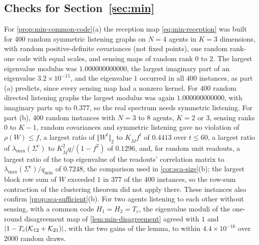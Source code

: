 \subsection{Checks for \texorpdfstring{Section~\ref{sec:min}}{the minimal model}}\label{chk:min}

\begin{numcheck}\label{chk:min-common-code}
For \cref{prop:min-common-code}(a) the reception map \eqref{eq:min-reception} was built for 400 random symmetric listening graphs on $N=4$ agents in $K=3$ dimensions, with random positive-definite covariances (not fixed points), one random rank-one code with equal scales, and sensing maps of random rank $0$ to $2$. The largest eigenvalue modulus was $1.000000000000$, the largest imaginary part of an eigenvalue $3.2\times10^{-15}$, and the eigenvalue $1$ occurred in all 400 instances, as part (a) predicts, since every sensing map had a nonzero kernel. For 400 random directed listening graphs the largest modulus was again $1.000000000000$, with imaginary parts up to $0.377$, so the real spectrum needs symmetric listening. For part (b), 400 random instances with $N=3$ to $8$ agents, $K=2$ or $3$, sensing ranks $0$ to $K-1$, random covariances and symmetric listening gave no violation of $\rho(W)\le f$, a largest ratio of $\Vert W^t\Vert_2$ to $K_{\tilde M}f^t$ of $0.4413$ over $t\le60$, a largest ratio of $\lambda_{\max}(\Sigma^c)$ to $K_{\tilde M}^2q/(1-f^2)$ of $0.1296$, and, for random unit readouts, a largest ratio of the top eigenvalue of the readouts' correlation matrix to $\lambda_{\max}(\Sigma^c)/q_{\min}$ of $0.7248$, the comparison used in \cref{cor:sca-size}(b); the largest block row sum of $W$ exceeded $1$ in 377 of the 400 instances, so the row-sum contraction of the clustering theorem did not apply there. These instances also confirm \cref{prop:sca-sufficient}(b). For two agents listening to each other without sensing, with a common code $H_1=H_2=T_c$, the eigenvalue moduli of the one-round disagreement map of \cref{lem:min-disagreement} agreed with $1$ and $\lvert1-T_c(\mathcal{K}_{12}+\mathcal{K}_{21})\rvert$, with the two gains of the lemma, to within $4.4\times10^{-16}$ over 2000 random draws.


\end{numcheck}

